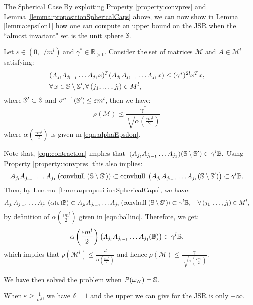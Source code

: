 \begin{subsection}{The Spherical Case}
By exploiting Property \ref{property:convpres} and Lemma~\ref{lemma:propositionSphericalCaps} above, we can now show in Lemma \ref{lemma:epsilon1} how one can compute an upper bound on the JSR when the ``almost invariant" set is the unit sphere $\mathbb{S}$.

\begin{prop}\label{lemma:epsilon1}
Let $\varepsilon \in (0, 1/m^l)$ and $\gamma^{*} \in \mathbb{R}_{> 0}$. Consider the set of matrices $\mathcal{M}$ and $A \in \mathcal{M}^l$ satisfying:
\begin{equation}\label{eqn:contraction}
\begin{aligned}
& (A_{j_l} A_{j_{l-1}} \dots A_{j_1} x)^T (A_{j_l} A_{j_{l-1}} \dots A_{j_1} x) \leq (\gamma^{*})^{2l} x^Tx, \\
& \forall\, x \in \mathbb{S} \setminus \mathbb{S}', \forall\,(j_1, \dots, j_l) \in M^l,
\end{aligned}
\end{equation}
where $\mathbb{S}' \subset \mathbb{S}$ and $\sigma^{n-1}(\mathbb{S}') \leq \varepsilon m^l$, then we have:
\begin{equation*}
\rho(\mathcal{M}) \leq \frac{\gamma^{*}}{\sqrt[l]{\alpha(\frac{\varepsilon m^l}{2})}}
\end{equation*}
where $\alpha(\frac{\varepsilon m^l}{2})$ is given in \eqref{eqn:alphaEpsilon}.
\end{prop}


\begin{pf}
Note that, \eqref{eqn:contraction} implies that:
$(A_{j_l} A_{j_{l-1}} \dots A_{j_1}) (\mathbb{S} \setminus \mathbb{S}') \subset \gamma^l \mathbb{B}.$
Using Property \ref{property:convpres} this also implies:
$$A_{j_l} A_{j_{l-1}} \dots A_{j_1} \left( \mbox{convhull }(\mathbb{S} \setminus \mathbb{S}') \right) \subset \mbox{convhull } \left( A_{j_l} A_{j_{l-1}} \dots A_{j_1}(\mathbb{S} \setminus \mathbb{S}') \right) \subset \gamma^l \mathbb{B} .$$
Then, by Lemma~\ref{lemma:propositionSphericalCaps}, we have:
$$A_{j_l} A_{j_{l-1}} \dots A_{j_1} \left( \alpha(\varepsilon) \mathbb{B} \right) \subset A_{j_l} A_{j_{l-1}} \dots A_{j_1} \left( \mbox{convhull } (\mathbb{S} \setminus \mathbb{S}') \right) \subset \gamma^l\mathbb{B}, \quad  \forall\, (j_1, \dots, j_l) \in M^l,$$
by definition of $\alpha(\frac{\varepsilon m^l}{2})$ given in \eqref{eqn:ballinc}. Therefore, we get:
$$\alpha \left( \frac{\varepsilon m^l}{2} \right) \left( A_{j_l} A_{j_{l-1}} \dots A_{j_1} (\mathbb{B}) \right) \subset \gamma^l\mathbb{B},$$
which implies that $\rho(\mathcal{M}^l) \leq \frac{\gamma^l}{\alpha(\frac{\varepsilon m^l}{2})}$ and hence $\rho(\mathcal{M}) \leq \frac{\gamma}{\sqrt[l]{\alpha(\frac{\varepsilon m^l}{2})}}$.
\end{pf}

We have then solved the problem when $P(\omega_N) = \mathbb{S}$.

\begin{rem}
When $\varepsilon \geq \frac{1}{m^l}$, we have $\delta = 1$ and the upper we can give for the JSR is only $+ \infty$.
\end{rem}

\end{subsection}


